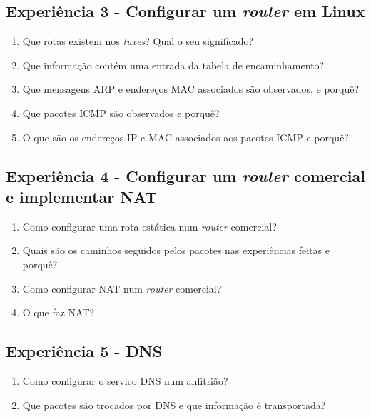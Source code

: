 \documentclass{article}
\begin{document}
\subsection{Experiência 3 - Configurar um \textit{router} em Linux}
\begin{enumerate}
\item Que rotas existem nos \textit{tuxes}? Qual o seu significado?

\item Que informação contém uma entrada da tabela de encaminhamento?

\item Que mensagens ARP e endereços MAC associados são observados, e porquê?

\item Que pacotes ICMP são observados e porquê?

\item O que são os endereços IP e MAC associados aos pacotes ICMP e porquê?
\end{enumerate}
\subsection{Experiência 4 - Configurar um \textit{router} comercial e implementar NAT}
\begin{enumerate}
\item Como configurar uma rota estática num \textit{router} comercial?

\item Quais são os caminhos seguidos pelos pacotes nas experiências feitas e porquê?

\item Como configurar NAT num \textit{router} comercial?

\item O que faz NAT?
\end{enumerate}
\subsection{Experiência 5 - DNS}
\begin{enumerate}
\item Como configurar o servico DNS num anfitrião?

\item Que pacotes são trocados por DNS e que informação é transportada?
\end{enumerate}
\end{document}
